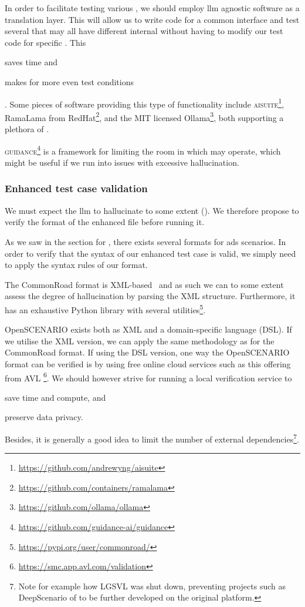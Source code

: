 In order to facilitate testing various , we should employ
\acrshort{llm} agnostic software as a translation layer. This will allow us to
write code for a common interface and test several  that may all
have different internal  without having to modify our test code
for specific . This \begin{inparaenum}
    \item saves time
    and
    \item makes for more even test conditions \end{inparaenum}. Some pieces of software providing
this type of functionality include
\textsc{aisuite}\footnote{\url{https://github.com/andrewyng/aisuite}}, RamaLama from
RedHat\footnote{\url{https://github.com/containers/ramalama}}, and the MIT licensed
Ollama\footnote{\url{https://github.com/ollama/ollama}}, both supporting a plethora of
.

\textsc{guidance}\footnote{\url{https://github.com/guidance-ai/guidance}} is a
framework for limiting the room in which  may operate, which
might be useful if we run into issues with excessive hallucination.


\subsubsection{Enhanced test case validation}

We must expect the \acrshort{llm} to hallucinate to some extent (). We
therefore propose to verify the format of the enhanced file before running it.

As we saw in the section for , there exists several formats for
\acrshort{ads} scenarios. In order to verify that the syntax of our enhanced test
case is valid, we simply need to apply the syntax rules of our format.

The CommonRoad format is XML-based~\cite[720]{commonRoadOG} and as such we can
to some extent assess the degree of hallucination by parsing the XML structure.
Furthermore, it has an exhaustive Python library with several utilities\footnote{\url{https://pypi.org/user/commonroad/}}.

OpenSCENARIO exists both as XML and a domain-specific language (DSL). If we
utilise the XML version, we can apply the same methodology as for the CommonRoad
format. If using the DSL version, one way
the OpenSCENARIO format can be verified is by using free
online cloud services such as this offering from AVL
\footnote{\url{https://smc.app.avl.com/validation}}. We should however strive for
running a local verification service to \begin{inparaenum}
    \item save time and compute,
    and
    \item preserve data privacy.
\end{inparaenum}
Besides, it is generally a good idea to limit the number of external dependencies\footnote{Note for
    example how LGSVL\cite{lgsvl} was shut down, preventing projects such as DeepScenario of
    \citeauthor{DeepScenario} to be further developed on the original platform.}.

